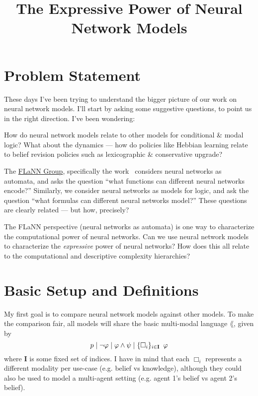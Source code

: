 \documentclass[letterpaper]{article}
\title{The Expressive Power of Neural Network Models}
\begin{document}
\maketitle

\section*{Problem Statement}

These days I've been trying to understand the bigger picture of our work on neural network models.  I'll start by asking some suggestive questions, to point us in the right direction. I've been wondering:

\begin{question}
    How do neural network models relate to other models for conditional \& modal logic?  What about the dynamics --- how do policies like Hebbian learning relate to belief revision policies such as lexicographic \& conservative upgrade?
\end{question}

\begin{question}
    The \href{http://flann.super.site/}{FLaNN Group}, specifically the work~\cite{merrill2019sequential,merrill2020formal,merrill2023expressive,strobl2024formal} considers neural networks as automata, and asks the question ``what functions can different neural networks encode?''  Similarly, we consider neural networks as models for logic, and ask the question ``what formulas can different neural networks model?''  These questions are clearly related --- but how, precisely?
\end{question}

\begin{question}
    The FLaNN perspective (neural networks as automata) is one way to characterize the computational power of neural networks.  Can we use neural network models to characterize the \emph{expressive} power of neural networks?  How does this all relate to the computational and descriptive complexity hierarchies?
\end{question}

\section*{Basic Setup and Definitions}

My first goal is to compare neural network models against other models.  To make the comparison fair, all models will share the basic multi-modal language $\lang$, given by
\[
    p \mid \neg \varphi \mid \varphi \land \psi \mid \{ \Box_i \}_{i \in \textbf{I}} \hspace*{0.5em} \varphi
\]
where \textbf{I} is some fixed set of indices.  I have in mind that each $\Box_i$ represents a different modality per use-case (e.g. belief vs knowledge), although they could also be used to model a multi-agent setting (e.g. agent 1's belief vs agent 2's belief).
\end{document}
